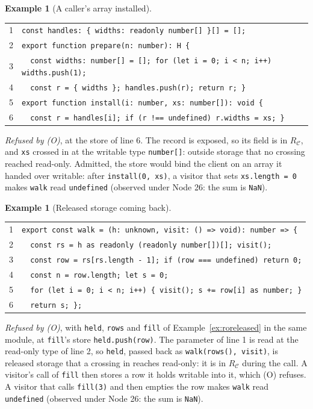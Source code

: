 \documentclass[10pt,a4paper]{article}
\theoremstyle{definition}
\newtheorem{example}[theorem]{Example}
\theoremstyle{remark}
\newcommand{\code}[1]{\texttt{#1}}
\newcommand{\cC}{\mathcal{C}}
\begin{document}
\begin{example}[A caller's array installed]\label{ex:roinstall}\mbox{}
\begin{center}\small
\begin{tabular}{@{}r@{\hspace{1em}}l@{}}
1 & \code{const handles: \{ widths: readonly number[] \}[] = [];}\\
2 & \code{export function prepare(n: number): H \{}\\
3 & \code{~~const widths: number[] = []; for (let i = 0; i < n; i++) widths.push(1);}\\
4 & \code{~~const r = \{ widths \}; handles.push(r); return r; \}}\\
5 & \code{export function install(i: number, xs: number[]): void \{}\\
6 & \code{~~const r = handles[i]; if (r !== undefined) r.widths = xs; \}}\\
\end{tabular}
\end{center}
\emph{Refused by (O)}, at the store of line 6. The record is exposed,
so its field is in $R_\cC$, and \code{xs} crossed in at the writable
type \code{number[]}: outside storage that no crossing reached
read-only. Admitted, the store would bind the client on an array it
handed over writable: after \code{install(0, xs)}, a visitor that sets
\code{xs.length = 0} makes \code{walk} read \code{undefined} (observed
under Node 26: the sum is \code{NaN}).
\end{example}
\begin{example}[Released storage coming back]\label{ex:roback}\mbox{}
\begin{center}\small
\begin{tabular}{@{}r@{\hspace{1em}}l@{}}
1 & \code{export const walk = (h: unknown, visit: () => void): number => \{}\\
2 & \code{~~const rs = h as readonly (readonly number[])[]; visit();}\\
3 & \code{~~const row = rs[rs.length - 1]; if (row === undefined) return 0;}\\
4 & \code{~~const n = row.length; let s = 0;}\\
5 & \code{~~for (let i = 0; i < n; i++) \{ visit(); s += row[i] as number; \}}\\
6 & \code{~~return s; \};}\\
\end{tabular}
\end{center}
\emph{Refused by (O)}, with \code{held}, \code{rows} and \code{fill} of
Example~\ref{ex:roreleased} in the same module, at \code{fill}'s store
\code{held.push(row)}. The parameter of line 1 is read at the read-only
type of line 2, so \code{held}, passed back as
\code{walk(rows(), visit)}, is released storage that a crossing in
reaches read-only: it is in $R_\cC$ during the call. A visitor's call of
\code{fill} then stores a row it holds writable into it, which (O)
refuses. A visitor that calls \code{fill(3)} and then empties the row
makes \code{walk} read \code{undefined} (observed under Node 26: the sum
is \code{NaN}).
\end{example}
\end{document}
